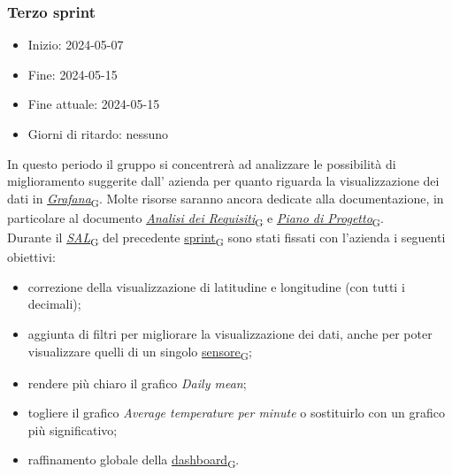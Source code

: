 \newpage
\subsubsection{Terzo sprint}
\begin{itemize}
	\item Inizio: 2024-05-07
	\item Fine: 2024-05-15
	\item Fine attuale: 2024-05-15
	\item Giorni di ritardo: nessuno
\end{itemize}

In questo periodo il gruppo si concentrerà ad analizzare le possibilità di miglioramento suggerite dall' azienda per quanto riguarda la visualizzazione dei dati in \href{https://7last.github.io/docs/pb/documentazione-interna/glossario\#grafana}{\textit{Grafana}\textsubscript{G}}. Molte risorse saranno ancora dedicate alla documentazione, in particolare al documento \href{https://7last.github.io/docs/pb/documentazione-interna/glossario\#analisi-dei-requisiti}{\textit{Analisi dei Requisiti}\textsubscript{G}} e \href{https://7last.github.io/docs/pb/documentazione-interna/glossario\#piano-di-progetto}{\textit{Piano di Progetto}\textsubscript{G}}. \\
Durante il \href{https://7last.github.io/docs/pb/documentazione-interna/glossario\#stato-avanzamento-lavori}{\textit{SAL}\textsubscript{G}} del precedente \href{https://7last.github.io/docs/pb/documentazione-interna/glossario\#sprint}{sprint\textsubscript{G}} sono stati fissati con l'azienda i seguenti obiettivi:
\begin{itemize}
	\item correzione della visualizzazione di latitudine e longitudine (con tutti i decimali);
	\item aggiunta di filtri per migliorare la visualizzazione dei dati, anche per poter visualizzare quelli di un singolo \href{https://7last.github.io/docs/pb/documentazione-interna/glossario\#sensore}{sensore\textsubscript{G}};
	\item rendere più chiaro il grafico \textit{Daily mean};
	\item togliere il grafico \textit{Average temperature per minute} o sostituirlo con un grafico più significativo;
	\item raffinamento globale della \href{https://7last.github.io/docs/pb/documentazione-interna/glossario\#dashboard}{dashboard\textsubscript{G}}.
\end{itemize}

